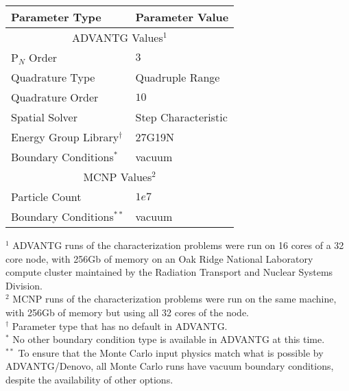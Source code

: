 \begin{tabular}{l|m{5cm}}
\toprule
Parameter Type & Parameter Value \\
\midrule \midrule
\multicolumn{2}{c}{ADVANTG Values$^1$} \\
\midrule
P$_N$ Order               &    $3$ \\
Quadrature Type           &  Quadruple Range \\
Quadrature Order          &    $10$ \\
Spatial Solver            &  Step Characteristic \\
Energy Group Library$^{\dagger}$     &    27G19N \\
Boundary Conditions$^{*}$ & vacuum \\
\midrule \midrule
\multicolumn{2}{c}{MCNP Values$^2$} \\
\midrule
Particle Count             &   $1e7$ \\
Boundary Conditions$^{**}$ & vacuum \\
\bottomrule
\end{tabular}
\begin{flushleft}
\footnotesize{
  $^1$ ADVANTG runs of the characterization problems
  were run on 16 cores of a 32 core node, with 256Gb of memory on
  an Oak Ridge National Laboratory compute cluster maintained by the Radiation
  Transport and Nuclear Systems Division. \\
  $^2$ MCNP runs of the characterization problems were run on the same
 machine, with 256Gb of memory but using all 32 cores of the node. \\
  $^{\dagger}$ Parameter type that has no default in ADVANTG. \\
  $^{*}$ No other boundary condition type is available in ADVANTG at this time. \\
  $^{**}$ To ensure that the Monte Carlo input physics match what is possible by
  ADVANTG/Denovo, all Monte Carlo runs have vacuum boundary conditions, despite
  the availability of other options.
}
\end{flushleft}

